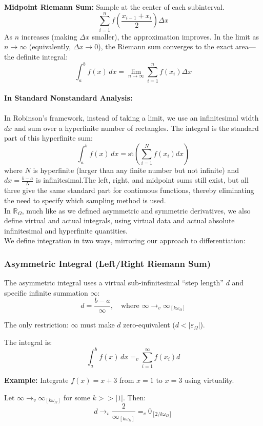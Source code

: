 \documentclass{article}
\begin{document}
\textbf{Midpoint Riemann Sum:} Sample at the center of each subinterval.
$$\sum_{i=1}^{n} f\left(\frac{x_{i-1} + x_i}{2}\right) \Delta x$$As $n$ increases (making $\Delta x$ smaller), the approximation improves. In the limit as $n \to \infty$ (equivalently, $\Delta x \to 0$), the Riemann sum converges to the exact area—the definite integral:
$$\int_a^b f(x) \, dx = \lim_{n \to \infty} \sum_{i=1}^{n} f(x_i) \Delta x$$\\\textbf{In Standard Nonstandard Analysis:}\\\\In Robinson's framework, instead of taking a limit, we use an infinitesimal width $dx$ and sum over a hyperfinite number of rectangles. The integral is the standard part of this hyperfinite sum:
$$\int_a^b f(x) \, dx = \text{st}\left(\sum_{i=1}^{N} f(x_i) dx\right)$$where $N$ is hyperfinite (larger than any finite number but not infinite) and $dx = \frac{b-a}{N}$ is infinitesimal.The left, right, and midpoint sums still exist, but all three give the same standard part for continuous functions, thereby eliminating the need to specify which sampling method is used.\\In $\mathbb{R}_\Omega$, much like as we defined asymmetric and symmetric derivatives, we also define virtual and actual integrals, using virtual data and actual absolute infinitesimal and hyperfinite quantities.\\We define integration in two ways, mirroring our approach to differentiation:

\subsubsection{Asymmetric Integral (Left/Right Riemann Sum)}

The asymmetric integral uses a virtual sub-infinitesimal ``step length'' $d$ and specific infinite summation $\infty$:
$$d = \frac{b - a}{\infty}, \quad \text{where } \infty \to_v \infty_{[k\omega_\Omega]}$$

The only restriction: $\infty$ must make $d$ zero-equivalent ($d < |\varepsilon_\Omega|$).

The integral is:
$$\int_a^b f(x) \, dx =_v \sum_{i=1}^{\infty} f(x_i) d$$

\textbf{Example:} Integrate $f(x) = x + 3$ from $x = 1$ to $x = 3$ using virtuality.

Let $\infty \to_v \infty_{[k\omega_\Omega]}$ for some $k>>|1|$. Then:
$$d\to_v \frac{2}{\infty_{[k\omega_\Omega]}} =_v 0_{[2/k\omega_\Omega]}$$
\end{document}

